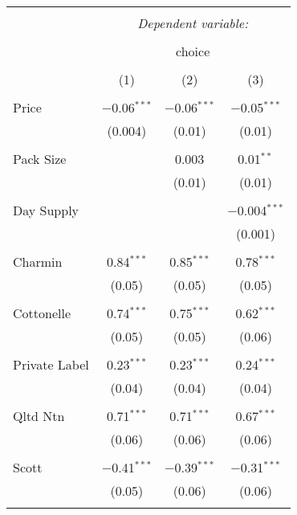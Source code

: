 
\begin{table}[!htbp] \centering 
  \caption{} 
  \label{tab:mnlBostonBaseline} 
\begin{tabular}{@{\extracolsep{5pt}}lccc} 
\\[-1.8ex]\hline 
\hline \\[-1.8ex] 
 & \multicolumn{3}{c}{\textit{Dependent variable:}} \\ 
\cline{2-4} 
\\[-1.8ex] & \multicolumn{3}{c}{choice} \\ 
\\[-1.8ex] & (1) & (2) & (3)\\ 
\hline \\[-1.8ex] 
 Price & $-$0.06$^{***}$ & $-$0.06$^{***}$ & $-$0.05$^{***}$ \\ 
  & (0.004) & (0.01) & (0.01) \\ 
  & & & \\ 
 Pack Size &  & 0.003 & 0.01$^{**}$ \\ 
  &  & (0.01) & (0.01) \\ 
  & & & \\ 
 Day Supply &  &  & $-$0.004$^{***}$ \\ 
  &  &  & (0.001) \\ 
  & & & \\ 
 Charmin & 0.84$^{***}$ & 0.85$^{***}$ & 0.78$^{***}$ \\ 
  & (0.05) & (0.05) & (0.05) \\ 
  & & & \\ 
 Cottonelle & 0.74$^{***}$ & 0.75$^{***}$ & 0.62$^{***}$ \\ 
  & (0.05) & (0.05) & (0.06) \\ 
  & & & \\ 
 Private Label & 0.23$^{***}$ & 0.23$^{***}$ & 0.24$^{***}$ \\ 
  & (0.04) & (0.04) & (0.04) \\ 
  & & & \\ 
 Qltd Ntn & 0.71$^{***}$ & 0.71$^{***}$ & 0.67$^{***}$ \\ 
  & (0.06) & (0.06) & (0.06) \\ 
  & & & \\ 
 Scott & $-$0.41$^{***}$ & $-$0.39$^{***}$ & $-$0.31$^{***}$ \\ 
  & (0.05) & (0.06) & (0.06) \\ 
  & & & \\ 

\end{tabular}
\end{table}
